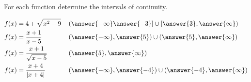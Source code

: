 \documentclass{ximera}
\author{Nela Lakos \and Kyle Parsons}
\begin{document}
\begin{exercise}

For each function determine the intervals of continuity.

\begin{align*}
f(x) &= 4+\sqrt{x^2-9} && \left(\answer{-\infty}\answer{-3}\right] \cup \left[\answer{3},\answer{\infty}\right)\\
f(x) &= \frac{x+1}{x-5} && \left(\answer{-\infty},\answer{5}\right) \cup \left(\answer{5},\answer{\infty}\right)\\
f(x) &= \frac{x+1}{\sqrt{x-5}} && \left(\answer{5},\answer{\infty}\right)\\
f(x) &= \frac{x+4}{\left|x+4\right|} && \left(\answer{-\infty},\answer{-4}\right) \cup \left(\answer{-4},\answer{\infty}\right)
\end{align*}

\end{exercise}
\end{document}
